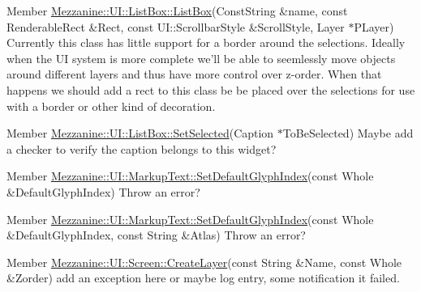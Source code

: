 \label{todo__todo000036}
\hypertarget{todo__todo000036}{}
 
\begin{DoxyDescription}
\item[Member \hyperlink{classMezzanine_1_1UI_1_1ListBox_a60130f372bc78fbb20f28270bbed8cf2}{Mezzanine::UI::ListBox::ListBox}(ConstString \&name, const RenderableRect \&Rect, const UI::ScrollbarStyle \&ScrollStyle, Layer $\ast$PLayer) ]Currently this class has little support for a border around the selections. Ideally when the UI system is more complete we'll be able to seemlessly move objects around different layers and thus have more control over z-\/order. When that happens we should add a rect to this class be be placed over the selections for use with a border or other kind of decoration. 
\end{DoxyDescription}

\label{todo__todo000037}
\hypertarget{todo__todo000037}{}
 
\begin{DoxyDescription}
\item[Member \hyperlink{classMezzanine_1_1UI_1_1ListBox_a81ddebed01b1503478c2fa7b75ce4b24}{Mezzanine::UI::ListBox::SetSelected}(Caption $\ast$ToBeSelected) ]Maybe add a checker to verify the caption belongs to this widget? 
\end{DoxyDescription}

\label{todo__todo000039}
\hypertarget{todo__todo000039}{}
 
\begin{DoxyDescription}
\item[Member \hyperlink{classMezzanine_1_1UI_1_1MarkupText_a8455dbc85e8ed56f366c14f1cab24f49}{Mezzanine::UI::MarkupText::SetDefaultGlyphIndex}(const Whole \&DefaultGlyphIndex) ]Throw an error? 
\end{DoxyDescription}

\label{todo__todo000040}
\hypertarget{todo__todo000040}{}
 
\begin{DoxyDescription}
\item[Member \hyperlink{classMezzanine_1_1UI_1_1MarkupText_a2cff9446978935a555fafdc0795de517}{Mezzanine::UI::MarkupText::SetDefaultGlyphIndex}(const Whole \&DefaultGlyphIndex, const String \&Atlas) ]Throw an error? 
\end{DoxyDescription}

\label{todo__todo000041}
\hypertarget{todo__todo000041}{}
 
\begin{DoxyDescription}
\item[Member \hyperlink{classMezzanine_1_1UI_1_1Screen_a47c85a1fad08b96b3b24b2c1402a4fcd}{Mezzanine::UI::Screen::CreateLayer}(const String \&Name, const Whole \&Zorder) ]add an exception here or maybe log entry, some notification it failed. 
\end{DoxyDescription}

